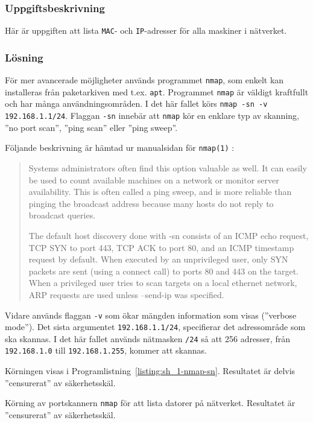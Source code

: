 \subsubsection{Uppgiftsbeskrivning}
Här är uppgiften att lista \texttt{MAC}- och \texttt{IP}-adresser för alla
maskiner i nätverket.


\subsubsection{Lösning}
För mer avancerade möjligheter används programmet \texttt{nmap}, som enkelt kan
installeras från paketarkiven med t.ex. \texttt{apt}.  Programmet \texttt{nmap}
är väldigt kraftfullt och har många användningsområden.  I det här fallet körs
\texttt{nmap -sn -v 192.168.1.1/24}.  Flaggan \texttt{-sn} innebär att
\texttt{nmap} kör en enklare typ av skanning, ''no port scan'', ''ping scan''
eller ''ping sweep''.

Följande beskrivning är hämtad ur manualsidan för \texttt{nmap(1)}
\cite{manpage:nmap}:

\begin{quotation}
Systems administrators often find this option valuable as well. It can easily
be used to count available machines on a network or monitor server
availability. This is often called a ping sweep, and is more reliable than
pinging the broadcast address because many hosts do not reply to broadcast
queries.

The default host discovery done with -sn consists of an ICMP echo request, TCP
SYN to port 443, TCP ACK to port 80, and an ICMP timestamp request by default.
When executed by an unprivileged user, only SYN packets are sent (using a
connect call) to ports 80 and 443 on the target. When a privileged user tries
to scan targets on a local ethernet network, ARP requests are used unless
--send-ip was specified.
\end{quotation}

Vidare används flaggan \texttt{-v} som ökar mängden information som visas
(''verbose mode''). Det sista argumentet \texttt{192.168.1.1/24}, specifierar
det adressområde som ska skannas. I det här fallet används nätmasken
\texttt{/24} så att 256 adresser, från \texttt{192.168.1.0} till
\texttt{192.168.1.255}, kommer att skannas.

Körningen visas i Programlistning~\ref{listing:sh_1-nmap-sn}.
Resultatet är delvis ''censurerat'' av säkerhetsskäl.

\begin{listing}[H]
  \caption{Körning av portskannern \texttt{nmap} för att lista datorer på
           nätverket. Resultatet är ''censurerat'' av säkerhetsskäl.}
  \label{listing:sh_1-nmap-sn}
\end{listing}

